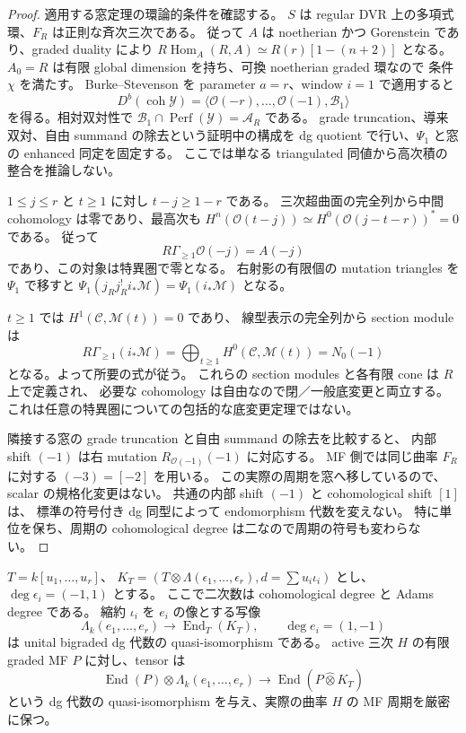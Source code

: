 \begin{proof}
適用する窓定理の環論的条件を確認する。
$S$ は regular DVR 上の多項式環、$F_R$ は正則な斉次三次である。
従って $A$ は noetherian かつ Gorenstein であり、graded duality により
$R\operatorname{Hom}_A(R,A)\simeq R(r)[1-(n+2)]$ となる。
$A_0=R$ は有限 global dimension を持ち、可換 noetherian graded 環なので
条件 $\chi$ を満たす。
Burke--Stevenson\cite[Definition~5.1, Proposition~4.18, Theorem~6.4(1)]{NFMBurkeStevenson}
を parameter $a=r$、window $i=1$ で適用すると
\[
 D^b(\operatorname{coh}\mathcal Y)
 =\langle\mathcal O(-r),\ldots,\mathcal O(-1),\mathcal B_1\rangle
\]
を得る。相対双対性で
$\mathcal B_1\cap\operatorname{Perf}(\mathcal Y)=\mathcal A_R$ である。
grade truncation、導来双対、自由 summand の除去という証明中の構成を
dg quotient で行い、$\Psi_1$ と窓の enhanced 同定を固定する。
ここでは単なる triangulated 同値から高次積の整合を推論しない。

$1\le j\le r$ と $t\ge1$ に対し $t-j\ge1-r$ である。
三次超曲面の完全列から中間 cohomology は零であり、最高次も
$H^n(\mathcal O(t-j))\simeq H^0(\mathcal O(j-t-r))^*=0$ である。
従って
\[
 R\Gamma_{\ge1}\mathcal O(-j)=A(-j)
\]
であり、この対象は特異圏で零となる。
右射影の有限個の mutation triangles を $\Psi_1$ で移すと
$\Psi_1(j_Rj_R^!i_*\mathcal M)=\Psi_1(i_*\mathcal M)$ となる。

$t\ge1$ では $H^1(\mathcal C,\mathcal M(t))=0$ であり、
線型表示の完全列から section module は
\[
 R\Gamma_{\ge1}(i_*\mathcal M)
 =\bigoplus_{t\ge1}H^0(\mathcal C,\mathcal M(t))=N_0(-1)
\]
となる。よって所要の式が従う。
これらの section modules と各有限 cone は $R$ 上で定義され、
必要な cohomology は自由なので閉／一般底変更と両立する。
これは任意の特異圏についての包括的な底変更定理ではない。

隣接する窓の grade truncation と自由 summand の除去を比較すると、
内部 shift $(-1)$ は右 mutation $R_{\mathcal O(-1)}(-1)$ に対応する。
MF 側では同じ曲率 $F_R$ に対する $(-3)=[-2]$ を用いる。
この実際の周期を窓へ移しているので、scalar の規格化変更はない。
共通の内部 shift $(-1)$ と cohomological shift $[1]$ は、
標準の符号付き dg 同型によって endomorphism 代数を変えない。
特に単位を保ち、周期の cohomological degree は二なので周期の符号も変わらない。
\end{proof}

\begin{lemma}
\label{lem:nfm-boundary-koszul-dg-separation}
$T=k[u_1,\ldots,u_r]$、
$K_T=(T\otimes\Lambda(\epsilon_1,\ldots,\epsilon_r),d=\sum u_i\iota_i)$ とし、
$\deg\epsilon_i=(-1,1)$ とする。
ここで二次数は cohomological degree と Adams degree である。
縮約 $\iota_i$ を $e_i$ の像とする写像
\[
 \Lambda_k(e_1,\ldots,e_r)\longrightarrow\operatorname{End}_T(K_T),
 \qquad\deg e_i=(1,-1)
\]
は unital bigraded dg 代数の quasi-isomorphism である。
active 三次 $H$ の有限 graded MF $P$ に対し、tensor は
\[
 \operatorname{End}(P)\otimes\Lambda_k(e_1,\ldots,e_r)
 \longrightarrow\operatorname{End}(P\widehat\otimes K_T)
\]
という dg 代数の quasi-isomorphism を与え、実際の曲率 $H$ の MF 周期を厳密に保つ。
\end{lemma}

